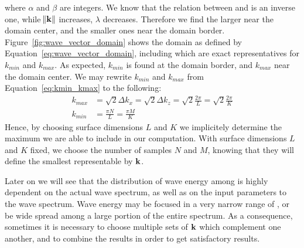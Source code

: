 where $\alpha$ and $\beta$ are integers.
%
We know that the relation between \wavelength and \wavenumber is an inverse one,
while $\norm{\mathbf{k}}$ increases, \wavelength $\lambda$ decreases. Therefore we find the larger
\wavelengths near the domain center, and the smaller ones near the domain border.
Figure~\ref{fig:wave_vector_domain} shows the \wavevector domain as defined
by Equation~\ref{eq:wave_vector_domain}, including \wavevectors which are exact
representatives for \wavenumbers $k_{min}$ and $k_{max}$. As expected, $k_{min}$
is found at the domain border, and $k_{max}$ near the domain center.
We may rewrite \wavenumbers $k_{min}$ and $k_{max}$ from
Equation~\ref{eq:kmin_kmax} to the following:
\begin{align*}
 k_{max} &= \sqrt{2}\Delta k_x = \sqrt{2}\Delta k_z = \sqrt{2}\frac{2\pi}{L} = \sqrt{2}\frac{2\pi}{K} \\
 k_{min} &= \frac{\pi N}{L} = \frac{\pi M}{K}
\end{align*}
Hence, by choosing surface dimensions $L$ and $K$ we implicitely determine the 
maximum \wavelength we are able to include in our computation.
With surface dimensions $L$ and $K$ fixed, we choose the number of 
samples $N$ and $M$, knowing that they will define the smallest \wavelength 
representable by \wavevectors $\mathbf{k}$.

Later on we will see that the 
distribution of wave energy among \wavevectors is highly dependent on the 
actual wave spectrum, as well as on the input parameters to the wave spectrum.
Wave energy may be focused in a very narrow range of \wavevectors, or be wide spread 
among a large portion of the entire \wavevector spectrum. As a consequence, 
sometimes it is necessary to choose multiple sets of \wavevectors 
$\mathbf{k}$ which complement one another, and to combine the results in order 
to get satisfactory results.
%

